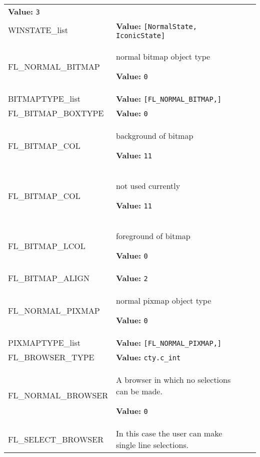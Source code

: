 \begin{longtable}{|p{\varnamewidth}|p{\vardescrwidth}|l}
\textbf{Value:} 
{\tt 3}&\\
\cline{1-2}
\raggedright W\-I\-N\-S\-T\-A\-T\-E\-\_\-l\-i\-s\-t\- & \raggedright \textbf{Value:} 
{\tt [NormalState, IconicState]}&\\
\cline{1-2}
\raggedright F\-L\-\_\-N\-O\-R\-M\-A\-L\-\_\-B\-I\-T\-M\-A\-P\- & \raggedright normal bitmap object type

\textbf{Value:} 
{\tt 0}&\\
\cline{1-2}
\raggedright B\-I\-T\-M\-A\-P\-T\-Y\-P\-E\-\_\-l\-i\-s\-t\- & \raggedright \textbf{Value:} 
{\tt [FL\_NORMAL\_BITMAP,]}&\\
\cline{1-2}
\raggedright F\-L\-\_\-B\-I\-T\-M\-A\-P\-\_\-B\-O\-X\-T\-Y\-P\-E\- & \raggedright \textbf{Value:} 
{\tt 0}&\\
\cline{1-2}
\raggedright F\-L\-\_\-B\-I\-T\-M\-A\-P\-\_\-C\-O\-L\-1\- & \raggedright background of bitmap

\textbf{Value:} 
{\tt 11}&\\
\cline{1-2}
\raggedright F\-L\-\_\-B\-I\-T\-M\-A\-P\-\_\-C\-O\-L\-2\- & \raggedright not used currently

\textbf{Value:} 
{\tt 11}&\\
\cline{1-2}
\raggedright F\-L\-\_\-B\-I\-T\-M\-A\-P\-\_\-L\-C\-O\-L\- & \raggedright foreground of bitmap

\textbf{Value:} 
{\tt 0}&\\
\cline{1-2}
\raggedright F\-L\-\_\-B\-I\-T\-M\-A\-P\-\_\-A\-L\-I\-G\-N\- & \raggedright \textbf{Value:} 
{\tt 2}&\\
\cline{1-2}
\raggedright F\-L\-\_\-N\-O\-R\-M\-A\-L\-\_\-P\-I\-X\-M\-A\-P\- & \raggedright normal pixmap object type

\textbf{Value:} 
{\tt 0}&\\
\cline{1-2}
\raggedright P\-I\-X\-M\-A\-P\-T\-Y\-P\-E\-\_\-l\-i\-s\-t\- & \raggedright \textbf{Value:} 
{\tt [FL\_NORMAL\_PIXMAP,]}&\\
\cline{1-2}
\raggedright F\-L\-\_\-B\-R\-O\-W\-S\-E\-R\-\_\-T\-Y\-P\-E\- & \raggedright \textbf{Value:} 
{\tt cty.c\_int}&\\
\cline{1-2}
\raggedright F\-L\-\_\-N\-O\-R\-M\-A\-L\-\_\-B\-R\-O\-W\-S\-E\-R\- & \raggedright A browser in which no selections can be made.

\textbf{Value:} 
{\tt 0}&\\
\cline{1-2}
\raggedright F\-L\-\_\-S\-E\-L\-E\-C\-T\-\_\-B\-R\-O\-W\-S\-E\-R\- & \raggedright In this case the user can make single line selections.


\end{longtable}
